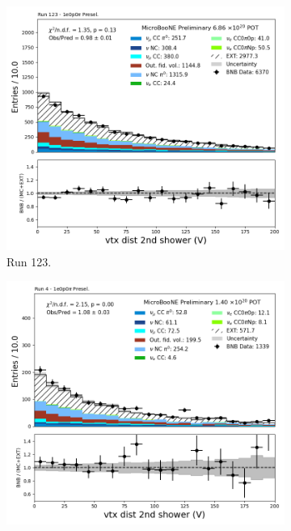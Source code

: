 \begin{figure}[H]
    \centering
    \begin{subfigure}[t]{0.32\linewidth}
        \includegraphics[width=\linewidth]{technote/Appendix_Preselection/Figures/1e0p0pi/Run123/secondshower_V_vtxdist_Run123_1e0p0pi_Presel.png}
        \caption{Run 123.}
    \end{subfigure}%
    \hspace{0.2cm}%
    \begin{subfigure}[t]{0.32\linewidth}
        \includegraphics[width=\linewidth]{technote/Appendix_Preselection/Figures/1e0p0pi/Run4b/secondshower_V_vtxdist_Run4b_1e0p0pi_Presel.png}

\end{subfigure}
\end{figure}
